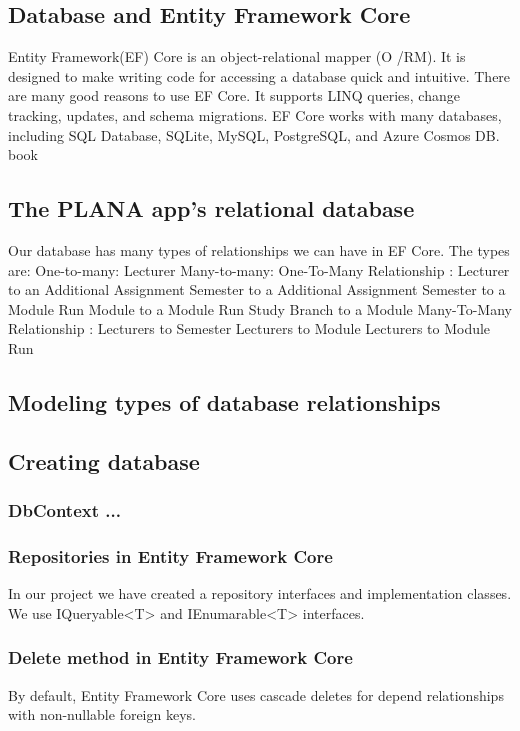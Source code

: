 \documentclass{scrartcl}
\begin{document}
\subsection{Database and Entity Framework Core}
Entity Framework(EF) Core is an object-relational mapper (O /RM). It is designed to make writing code for accessing a database quick and intuitive.
There are many good reasons to use EF Core. It supports LINQ queries, change tracking, updates, and schema migrations. EF Core works with many databases, including SQL Database, SQLite, MySQL, PostgreSQL, and Azure Cosmos DB.
book \cite{efa} \cite{ef}

\subsection{The PLANA app's relational database}
Our database has many types of relationships we can have in EF Core. The types are:
One-to-many: Lecturer
Many-to-many:
One-To-Many Relationship : 
Lecturer to an Additional Assignment 
Semester to a Additional Assignment
Semester to a Module Run 
Module to a Module Run
Study Branch to a Module
Many-To-Many Relationship :
Lecturers to Semester
Lecturers to Module
Lecturers to Module Run




\subsection{Modeling types of database relationships}

\subsection{Creating database}

\subsubsection{DbContext ...}
\subsubsection{Repositories in Entity Framework Core}
In our project we have created a repository interfaces and implementation classes.\\
We use IQueryable<T> and IEnumarable<T> interfaces. 
\citep{core3}


\subsubsection{Delete method in Entity Framework Core}
By default, Entity Framework Core uses cascade deletes for depend relationships with non-nullable foreign keys. \cite{efa}
\end{document}
